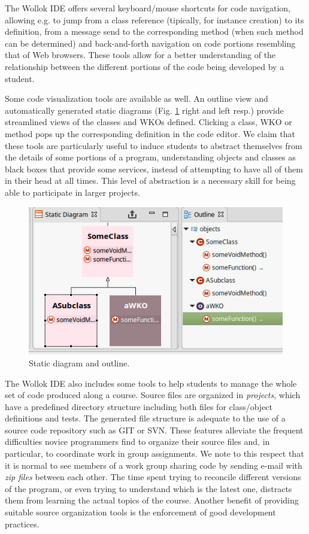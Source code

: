 The Wollok IDE offers several keyboard/mouse shortcuts for code navigation, allowing e.g. to jump from a class reference (tipically, for instance creation) to its definition, from a message send to the corresponding method (when such method can be determined) and back-and-forth navigation on code portions resembling that of Web browsers.
These tools allow for a better understanding of the relationship between the different portions of the code being developed by a student.

Some code visualization tools are available as well. An outline view and automatically generated static diagrams (\cf Fig. \ref{fig:outline} right and left resp.) provide streamlined views of the classes and WKOs defined. Clicking a class, WKO or method pops up the corresponding definition in the code editor.
We claim that these tools are particularly useful to induce students to abstract themselves from the details of some portions of a program, understanding objects and classes as black boxes that provide some services, instead of attempting to have all of them in their head at all times. This level of abstraction is a necessary skill for being able to participate in larger projects.

\begin{figure}[ht]
 \centering
 \includegraphics[scale=0.5]{images/outline.png}
 \caption{\small Static diagram and outline.}
 \label{fig:outline}
\end{figure}

The Wollok IDE also includes some tools to help students to manage the whole set of code produced along a course.
Source files are organized in \emph{projects}, which have a predefined directory structure including both files for class/object definitions and tests.
The generated file structure is adequate to the use of a source code repository such as GIT or SVN.
These features alleviate the frequent difficulties novice programmers find to organize their source files and, in particular, to coordinate work in group assignments.
We note to this respect that it is normal to see members of a work group sharing code by sending e-mail with \emph{zip files} between each other.
The time spent trying to reconcile different versions of the program, or even trying to understand which is the latest one, distracts them from learning the actual topics of the course.
Another benefit of providing suitable source organization tools is the enforcement of good development practices.

